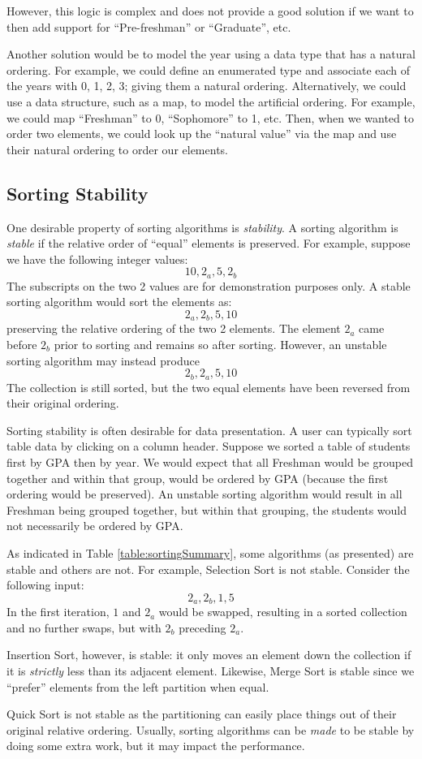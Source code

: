 However, this logic is complex and does not provide a good solution if
we want to then add support for ``Pre-freshman'' or ``Graduate'', etc.

Another solution would be to model the year using a data type that has a 
natural ordering.  For example, we could define an enumerated type
and associate each of the years with 0, 1, 2, 3; giving them a
natural ordering. Alternatively, we could use a data structure, 
such as a map, to model
the artificial ordering.  For example, we could map ``Freshman'' to 0, 
``Sophomore'' to 1, etc. Then, when we wanted to order two elements, we
could look up the ``natural value'' via the map and use their natural
ordering to order our elements.


\subsection{Sorting Stability}
\label{subsection:sortingStability}

One desirable property of sorting algorithms is \emph{stability}.  A
sorting algorithm is \emph{stable} if the relative order of ``equal'' 
elements is preserved.  For example, suppose we have the following
integer values:
  $$10, 2_a, 5, 2_b$$
The subscripts on the two 2 values are for demonstration purposes only.
A stable sorting algorithm would sort the elements as:
  $$2_a, 2_b, 5, 10$$
preserving the relative ordering of the two 2 elements.  The element
$2_a$ came before $2_b$ prior to sorting and remains so after sorting.  
However, an
unstable sorting algorithm may instead produce
  $$2_b, 2_a, 5, 10$$
The collection is still sorted, but the two equal elements have been 
reversed from their original ordering.

Sorting stability is often desirable for data presentation.  A user
can typically sort table data by clicking on a column header.  Suppose
we sorted a table of students first by GPA then by year.  We would expect
that all Freshman would be grouped together and within that group, would
be ordered by GPA (because the first ordering would be preserved).  An
unstable sorting algorithm would result in all Freshman being grouped together, but within that grouping, the students would not necessarily be ordered 
by GPA.

As indicated in Table \ref{table:sortingSummary}, some algorithms (as presented)
are stable and others are not.  For example, Selection Sort is not stable.  
Consider the following input:
 $$2_a, 2_b, 1, 5$$
In the first iteration, $1$ and $2_a$ would be swapped, resulting in a
sorted collection and no further swaps, but with $2_b$ preceding $2_a$.

Insertion Sort, however, is stable: it only moves an element down the
collection if it is \emph{strictly} less than its adjacent element.  Likewise,
Merge Sort is stable since we ``prefer'' elements from the left partition
when equal.

Quick Sort is not stable as the partitioning can easily place things out of
their original relative ordering.  Usually, sorting algorithms can be 
\emph{made} to be stable by doing some extra work, but it may impact the
performance.


